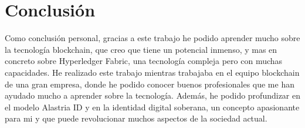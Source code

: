 \section{Conclusión}
Como conclusión personal, gracias a este trabajo he podido aprender mucho sobre la tecnología blockchain, que creo que tiene un potencial inmenso, y mas en concreto sobre Hyperledger Fabric, una tecnología compleja pero con muchas capacidades. He realizado este trabajo mientras trabajaba en el equipo blockchain de una gran empresa, donde he podido conocer buenos profesionales que me han ayudado mucho a aprender sobre la tecnología. Además, he podido profundizar en el modelo Alastria ID y en la identidad digital soberana, un concepto apasionante para mi y que puede revolucionar muchos aspectos de la sociedad actual.
